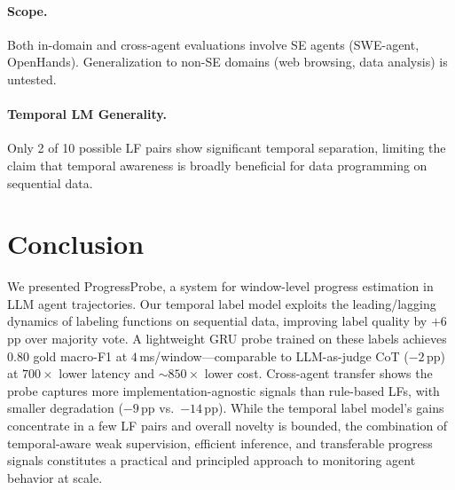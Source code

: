 \documentclass[11pt]{article}
\begin{document}
\paragraph{Scope.}
Both in-domain and cross-agent evaluations involve SE agents (SWE-agent, OpenHands).
Generalization to non-SE domains (web browsing, data analysis) is untested.

\paragraph{Temporal LM Generality.}
Only 2 of 10 possible LF pairs show significant temporal separation, limiting the claim that temporal awareness is broadly beneficial for data programming on sequential data.

\section{Conclusion}
\label{sec:conclusion}

We presented ProgressProbe, a system for window-level progress estimation in LLM agent trajectories.
Our temporal label model exploits the leading/lagging dynamics of labeling functions on sequential data, improving label quality by $+6$\,pp over majority vote.
A lightweight GRU probe trained on these labels achieves $0.80$ gold macro-F1 at $4$\,ms/window---comparable to LLM-as-judge CoT ($-2$\,pp) at $700\times$ lower latency and ${\sim}850\times$ lower cost.
Cross-agent transfer shows the probe captures more implementation-agnostic signals than rule-based LFs, with smaller degradation ($-9$\,pp vs.\ $-14$\,pp).
While the temporal label model's gains concentrate in a few LF pairs and overall novelty is bounded, the combination of temporal-aware weak supervision, efficient inference, and transferable progress signals constitutes a practical and principled approach to monitoring agent behavior at scale.


\end{document}
